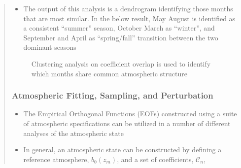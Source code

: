 \documentclass[letterpaper,10pt,english]{sphinxmanual}
\let\sphinxpxdimen\pdfpxdimen\else\newdimen\sphinxpxdimen
\begin{document}
\begin{itemize}
\begin{quote}
\begin{sphinxVerbatim}[commandchars=\\\{\}]
   
  
\end{sphinxVerbatim}
\begin{itemize}
\item {} 
The output of this analysis is a dendrogram identifying those months that are most similar.  In the below result, May \sphinxhyphen{} August is identified as a consistent “summer” season, October \sphinxhyphen{} March as “winter”, and September and April as “spring/fall” transition between the two dominant seasons

\end{itemize}

\begin{figure}[htbp]
\centering
\capstart

\noindent\sphinxincludegraphics[width=400\sphinxpxdimen]{{example_seasonality}.png}
\caption{Clustering analysis on coefficient overlap is used to identify which months share common atmospheric structure}\label{\detokenize{eofs:id2}}\end{figure}


\subsubsection{Atmospheric Fitting, Sampling, and Perturbation}
\label{\detokenize{sampling:atmospheric-fitting-sampling-and-perturbation}}\label{\detokenize{sampling:sampling}}\label{\detokenize{sampling::doc}}\begin{itemize}
\item {} 
The Empirical Orthogonal Functions (EOFs) constructed using a suite of atmospheric specifications can be utilized in a number of different analyses of the atmospheric state

\item {} 
In general, an atmospheric state can be constructed by defining a reference atmosphere, \(b_0 \left( z_m \right)\), and a set of coefficients, \(\mathcal{C}_n\),


\end{itemize}
\end{quote}
\end{itemize}
\end{document}
